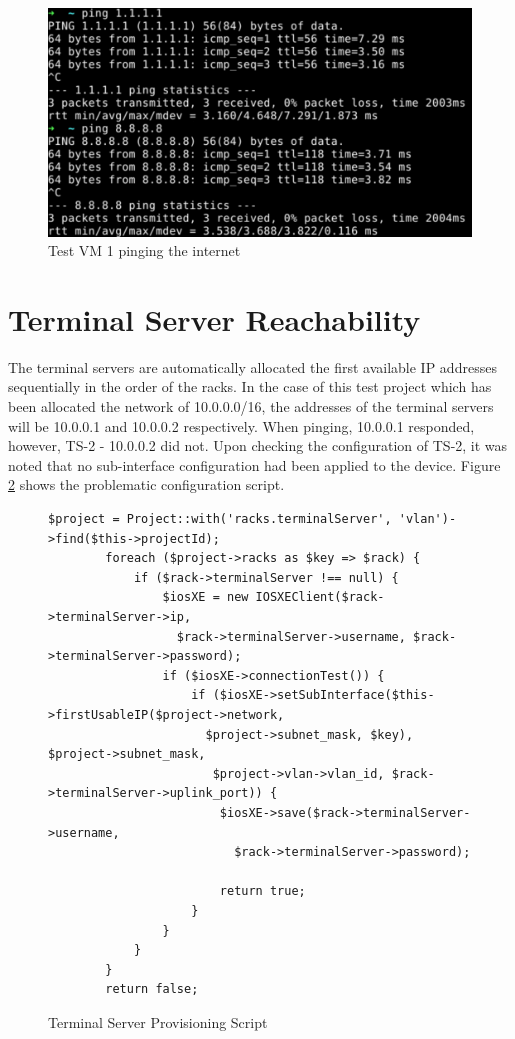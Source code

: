 \begin{figure}[H]
    \centering
    \includegraphics[scale=0.5]{images/test-project-1-ping-internet.png}
    \caption{Test VM 1 pinging the internet}
    \label{fig:test-project-1-ping-internet}
\end{figure}

\section{Terminal Server Reachability}

The terminal servers are automatically allocated the first available IP addresses sequentially in the order of the racks. In the case of this test project which has been allocated the network of 10.0.0.0/16, the addresses of the terminal servers will be 10.0.0.1 and 10.0.0.2 respectively. When pinging, 10.0.0.1 responded, however, TS-2 - 10.0.0.2 did not. Upon checking the configuration of TS-2, it was noted that no sub-interface configuration had been applied to the device. Figure \ref{fig:terminal-server-provision-bug} shows the problematic configuration script.

\begin{figure}[H]
    \begin{lstlisting}[basicstyle=\scriptsize]
        $project = Project::with('racks.terminalServer', 'vlan')->find($this->projectId);
        foreach ($project->racks as $key => $rack) {
            if ($rack->terminalServer !== null) {
                $iosXE = new IOSXEClient($rack->terminalServer->ip,
                  $rack->terminalServer->username, $rack->terminalServer->password);
                if ($iosXE->connectionTest()) {
                    if ($iosXE->setSubInterface($this->firstUsableIP($project->network,
                      $project->subnet_mask, $key), $project->subnet_mask,
                       $project->vlan->vlan_id, $rack->terminalServer->uplink_port)) {
                        $iosXE->save($rack->terminalServer->username,
                          $rack->terminalServer->password);

                        return true;
                    }
                }
            }
        }
        return false;

    \end{lstlisting}
    \caption{Terminal Server Provisioning Script}
    \label{fig:terminal-server-provision-bug}
\end{figure}

